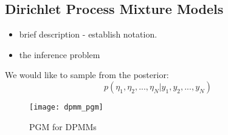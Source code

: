\subsection{Dirichlet Process Mixture Models}

\begin{itemize}
	\item brief description - establish notation.
	\item the inference problem
\end{itemize}

We would like to sample from the posterior:
$$  p(\eta_1, \eta_2, ..., \eta_N | y_1, y_2, ..., y_N) $$ 

\begin{figure}[!h]
\begin{center}
  \texttt{[image: dpmm\_pgm]}
\caption{PGM for DPMMs}
  \label{fig:dpmm_pgm}
\end{center}
\end{figure}
